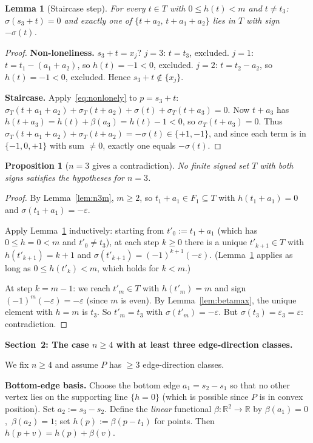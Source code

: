 \documentclass{article}
\newtheorem{lemma}{Lemma}
\newtheorem{prop}{Proposition}
\begin{document}
\begin{lemma}[Staircase step]\label{lem:step}
For every $t\in T$ with $0\le h(t)<m$ and $t\ne t_3$\textup{:}
$\sigma(s_3+t)=0$ and exactly one of $\{t+a_2,\,t+a_1+a_2\}$ lies in $T$ with
sign $-\sigma(t)$.
\end{lemma}
\begin{proof}
\textbf{Non-loneliness.}
$s_3+t=x_j$?
$j=3$: $t=t_3$, excluded.
$j=1$: $t=t_1-(a_1+a_2)$, so $h(t)=-1<0$, excluded.
$j=2$: $t=t_2-a_2$, so $h(t)=-1<0$, excluded.
Hence $s_3+t\notin\{x_j\}$.

\textbf{Staircase.}
Apply~\eqref{eq:nonlonely} to $p=s_3+t$:
$\sigma_T(t+a_1+a_2)+\sigma_T(t+a_2)+\sigma(t)+\sigma_T(t+a_3)=0$.
Now $t+a_3$ has $h(t+a_3)=h(t)+\beta(a_3)=h(t)-1<0$, so $\sigma_T(t+a_3)=0$.
Thus $\sigma_T(t+a_1+a_2)+\sigma_T(t+a_2)=-\sigma(t)\in\{+1,-1\}$, and
since each term is in $\{-1,0,+1\}$ with sum $\ne 0$, exactly one equals $-\sigma(t)$.
\end{proof}

\begin{prop}[$n=3$ gives a contradiction]\label{prop:n3}
No finite signed set $T$ with both signs satisfies the hypotheses for $n=3$.
\end{prop}
\begin{proof}
By Lemma~\ref{lem:n3m}, $m\ge 2$, so $t_1+a_1\in F_1\subseteq T$
with $h(t_1+a_1)=0$ and $\sigma(t_1+a_1)=-\varepsilon$.

Apply Lemma~\ref{lem:step} inductively: starting from $t'_0:=t_1+a_1$
(which has $0\le h=0<m$ and $t'_0\ne t_3$), at each step $k\ge 0$
there is a unique $t'_{k+1}\in T$ with $h(t'_{k+1})=k+1$ and
$\sigma(t'_{k+1})=(-1)^{k+1}(-\varepsilon)$.
(Lemma~\ref{lem:step} applies as long as $0\le h(t'_k)<m$, which holds for $k<m$.)

At step $k=m-1$: we reach $t'_m\in T$ with $h(t'_m)=m$ and sign
$(-1)^m(-\varepsilon)=-\varepsilon$ (since $m$ is even).
By Lemma~\ref{lem:betamax}, the unique element with $h=m$ is $t_3$.
So $t'_m=t_3$ with $\sigma(t'_m)=-\varepsilon$.
But $\sigma(t_3)=\varepsilon_3=\varepsilon$: contradiction.
\end{proof}

\bigskip
\noindent\textbf{Section~2: The case $n\ge 4$ with at least three edge-direction classes.}

We fix $n\ge 4$ and assume $P$ has $\ge 3$ edge-direction classes.

\medskip
\noindent\textbf{Bottom-edge basis.}
Choose the bottom edge $a_1=s_2-s_1$ so that no other vertex lies on the
supporting line $\{h=0\}$ (which is possible since $P$ is in convex position).
Set $a_2:=s_3-s_2$.
Define the \emph{linear} functional $\beta:\mathbb{R}^2\to\mathbb{R}$ by $\beta(a_1)=0$,\ $\beta(a_2)=1$;
set $h(p):=\beta(p-t_1)$ for points.
Then $h(p+v)=h(p)+\beta(v)$.
\end{document}
